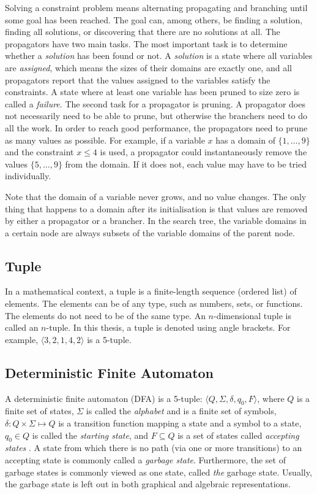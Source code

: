 \documentclass[a4paper,11pt]{article}
\begin{document}
Solving a constraint problem means alternating propagating and branching until some goal has been reached. The goal can, among others, be finding a solution, finding all solutions, or discovering that there are no solutions at all. The propagators have two main tasks. The most important task is to determine whether a \textit{solution} has been found or not. A \textit{solution} is a state where all variables are \textit{assigned}, which means the sizes of their domains are exactly one, and all propagators report that the values assigned to the variables satisfy the constraints. A state where at least one variable has been pruned to size zero is called a \textit{failure}. The second task for a propagator is pruning. A propagator does not necessarily need to be able to prune, but otherwise the branchers need to do all the work. In order to reach good performance, the propagators need to prune as many values as possible. For example, if a variable $x$ has a domain of $\{1,\ldots,9\}$ and the constraint $x\le 4$ is used, a propagator could instantaneously remove the values $\{5,\ldots,9\}$ from the domain. If it does not, each value may have to be tried individually.

Note that the domain of a variable never grows, and no value changes. The only thing that happens to a domain after its initialisation is that values are removed by either a propagator or a brancher. In the search tree, the variable domains in a certain node are always subsets of the variable domains of the parent node. 

\subsection{Tuple}
In a mathematical context, a tuple is a finite-length sequence (ordered list) of elements. The elements can be of any type, such as numbers, sets, or functions. The elements do not need to be of the same type. An $n$-dimensional tuple is called an $n$-tuple. In this thesis, a tuple is denoted using angle brackets. For example, $\langle 3, 2, 1, 4, 2 \rangle$ is a 5-tuple. 

\subsection{Deterministic Finite Automaton}
\label{sec:dfa}
A deterministic finite automaton (DFA) is a 5-tuple: $\langle Q,\Sigma,\delta,q_0, F\rangle$, where $Q$ is a finite set of states, $\Sigma$ is called the \textit{alphabet} and is a finite set of symbols, $\delta : Q \times \Sigma \mapsto Q$  is a transition function mapping a state and a symbol to a state, $q_0\in Q$ is called the \textit{starting state}, and $F\subseteq Q$  is a set of states called \textit{accepting states} \cite{hopcroft2001introduction}. A state from which there is no path (via one or more transitions) to an accepting state is commonly called a \textit{garbage state}. Furthermore, the set of garbage states is commonly viewed as one state, called \textit{the} garbage state. Usually, the garbage state is left out in both graphical and algebraic representations. 
\end{document}
